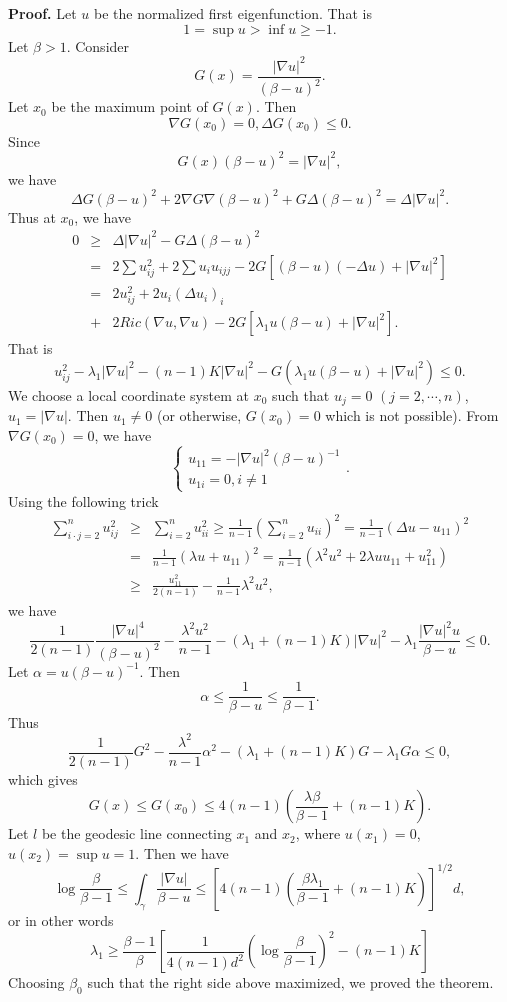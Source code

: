 {\bf Proof.}
Let $u$ be the normalized first eigenfunction. That is
\[
1 = \sup u > \inf u \geqslant -1.
\]
Let $\beta > 1$. Consider
\[
G(x) = \frac{|\nabla u|^2}{(\beta - u)^2}.
\]
Let $x_0$ be the maximum point of $G(x)$. Then
\[
\nabla G(x_0) = 0, \Delta G(x_0) \leqslant 0.
\]
Since
\[
G(x)(\beta - u)^2 = |\nabla u|^2,
\]
we have
\[
\Delta G(\beta - u)^2 +2\nabla G \nabla(\beta-u)^2 + G\Delta(\beta - u)^2
= \Delta|\nabla u|^2.
\]
Thus at $x_0$, we have
\begin{eqnarray}
\nonumber 0 & \geqslant & \Delta |\nabla u|^2 - G \Delta (\beta - u)^2 \\
\nonumber & = & 2\sum u_{ij}^2 + 2\sum u_i u_{ijj} - 2G[(\beta - u)(-\Delta u) + 
|\nabla u|^2] \\
\nonumber & = & 2u_{ij}^2 + 2u_i(\Delta u_i)_i \\
\nonumber & + & 2Ric(\nabla u, \nabla u) - 
2G[\lambda_1 u (\beta - u) + |\nabla u|^2].
\end{eqnarray}
That is
\[
u_{ij}^2 - \lambda_1 |\nabla u|^2 - (n-1)K|\nabla u|^2
- G(\lambda_1 u (\beta - u) + |\nabla u|^2) \leqslant 0.
\]
We choose a local coordinate system at $x_0$ such that $u_j = 0$ 
$(j=2,\cdots,n)$, $u_1 = |\nabla u|$. Then $u_1 \neq 0$ (or otherwise, 
$G(x_0) = 0$ which is not possible). From $\nabla G(x_0) = 0$, we have
\[
\left\{\begin{array}{l}
u_{11} = -|\nabla u|^2 (\beta -u)^{-1} \\
u_{1i} = 0, i \neq 1
\end{array}
\right..
\]
Using the following trick
\begin{eqnarray}
\nonumber \sum_{i\cdot j=2}^n u_{ij}^2 & \geqslant & 
\sum_{i=2}^n u_{ii}^2 \geqslant \frac{1}{n-1}\left(\sum_{i=2}^n u_{ii}\right)^2
 = \frac{1}{n-1}(\Delta u - u_{11})^2 \\
\nonumber & = & \frac{1}{n-1}(\lambda u + u_{11})^2 = 
\frac{1}{n-1}(\lambda^2 u^2 + 2\lambda u u_{11} + u_{11}^2) \\
\nonumber & \geqslant & \frac{u_{11}^2}{2(n-1)} - \frac{1}{n-1}\lambda^2 u^2,
\end{eqnarray}
 we have
\[
\frac{1}{2(n-1)}\frac{|\nabla u|^4}{(\beta - u)^2} - \frac{\lambda^2 u^2}{n-1}
- (\lambda_1 + (n-1)K)|\nabla u|^2 - \lambda_1\frac{|\nabla u|^2 u}{\beta - u}
\leqslant 0.
\]
Let $\alpha = u(\beta - u)^{-1}$. Then
\[
\alpha \leqslant \frac{1}{\beta - u} \leqslant \frac{1}{\beta - 1}.
\]
Thus
\[
\frac{1}{2(n-1)}G^2 - \frac{\lambda^2}{n-1}\alpha^2 - (\lambda_1 + (n-1)K)G
-\lambda_1 G\alpha \leqslant 0,
\]
which gives 
\[
G(x) \leqslant G(x_0) \leqslant 4(n-1)
\left(\frac{\lambda\beta}{\beta-1} + (n-1)K\right).
\]
Let $l$ be the geodesic line connecting $x_1$ and $x_2$, where $u(x_1) = 0$,
$u(x_2) = \sup u = 1$. Then we have
\[
\log\frac{\beta}{\beta - 1} \leqslant \int_\gamma \frac{|\nabla u|}{\beta - u}
\leqslant \left[4(n-1)\left(\frac{\beta\lambda_1}{\beta-1}+(n-1)K\right)\right]^{1/2}d,
\]
or in other words
\[
\lambda_1 \geqslant \frac{\beta-1}{\beta}\left[\frac{1}{4(n-1)d^2}
\left(\log\frac{\beta}{\beta - 1}\right)^2 - (n-1)K\right]
\]
Choosing $\beta_0$ such that the right side above maximized, we proved the
theorem.

